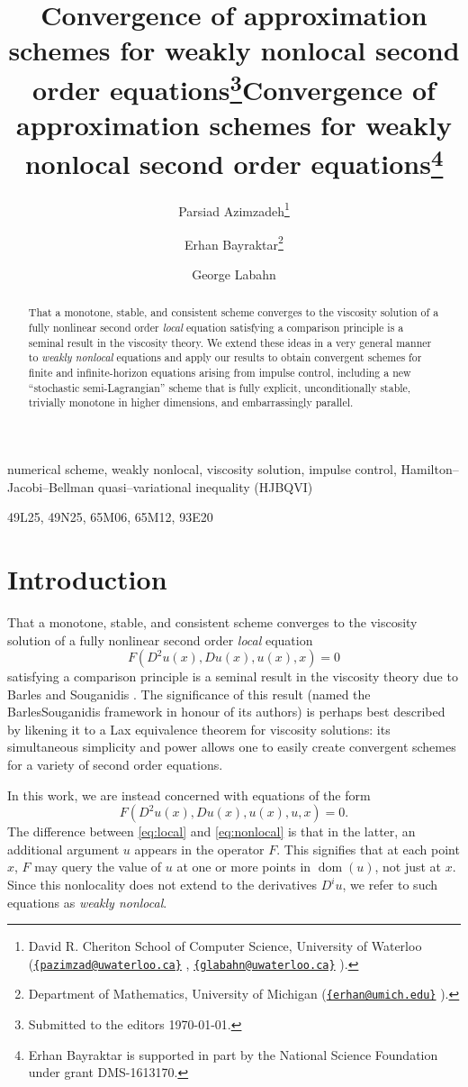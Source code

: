 \documentclass[12pt]{article}
\author{Parsiad Azimzadeh\thanks{David R. Cheriton School of Computer Science, University of Waterloo ({\href{mailto:{pazimzad@uwaterloo.ca}}{\nolinkurl{{pazimzad@uwaterloo.ca}}} }, {\href{mailto:{glabahn@uwaterloo.ca}}{\nolinkurl{{glabahn@uwaterloo.ca}}} }).}\and
Erhan Bayraktar\thanks{Department of Mathematics, University of Michigan
({\href{mailto:{erhan@umich.edu}}{\nolinkurl{{erhan@umich.edu}}} }).}
\and
George Labahn\footnotemark[2]
}
\title{Convergence of approximation schemes for weakly nonlocal second order equations\thanks{Submitted to the editors \today. \funding{Erhan Bayraktar is supported in part by the National Science Foundation under grant DMS-1613170.}}}
\title{Convergence of approximation schemes for weakly nonlocal second order equations\thanks{Erhan Bayraktar is supported in part by the National Science Foundation under grant DMS-1613170.}}
\date{}
\newenvironment{keywords}{{\bf Key words.}}{\medskip{}}
\newenvironment{AMS}{{\bf AMS subject classifications.}}{}
\begin{document}
\maketitle

\begin{abstract}
That a monotone, stable, and consistent scheme converges to the viscosity solution of a fully nonlinear second order \emph{local} equation satisfying a comparison principle is a seminal result in the viscosity theory.
We extend these ideas in a very general manner to \emph{weakly nonlocal} equations and apply our results to obtain convergent schemes for finite and infinite-horizon equations arising from impulse control, including a new ``stochastic semi-Lagrangian'' scheme that is fully explicit, unconditionally stable, trivially monotone in higher dimensions, and embarrassingly parallel.
\end{abstract}

\begin{keywords}
numerical scheme, weakly nonlocal, viscosity solution, impulse control, Hamilton--Jacobi--Bellman quasi--variational inequality (HJBQVI)
\end{keywords}

\begin{AMS}
49L25, 49N25, 65M06, 65M12, 93E20
\end{AMS}

\section{Introduction}

That a monotone, stable, and consistent scheme converges to the viscosity
solution of a fully nonlinear second order \emph{local} equation
\begin{equation}
F(D^{2}u(x),Du(x),u(x),x)=0\tag{loc.}\label{eq:local}
\end{equation}
satisfying a comparison principle is a seminal result in the viscosity
theory due to Barles and Souganidis \cite{MR1115933}. The significance
of this result (named the Barles\textendash Souganidis framework in
honour of its authors) is perhaps best described by likening it to
a Lax equivalence theorem for viscosity solutions: its simultaneous
simplicity and power allows one to easily create convergent schemes
for a variety of second order equations.

In this work, we are instead concerned with equations of the form
\begin{equation}
F(D^{2}u(x),Du(x),u(x),u,x)=0.\tag{nonloc.}\label{eq:nonlocal}
\end{equation}
The difference between \eqref{eq:local} and \eqref{eq:nonlocal}
is that in the latter, an additional argument $u$ appears in the
operator $F$. This signifies that at each point $x$, $F$ may query
the value of $u$ at one or more points in ${\operatorname{dom}}(u)$, not just at
$x$. Since this nonlocality does not extend to the derivatives $D^{i}u$, we refer to such equations as \emph{weakly nonlocal}.
\end{document}
